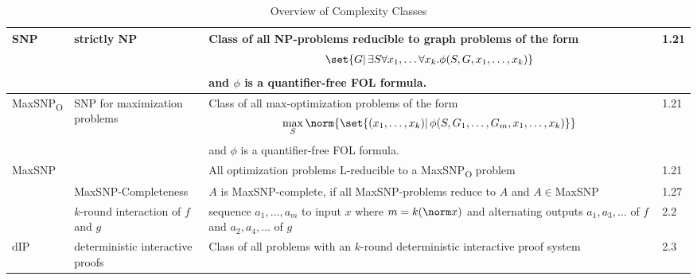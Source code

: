 \documentclass[a4paper, 9pt, landscape]{article}
\begin{document}
\begin{table}[ht!]
\begin{tabular}[ht!]{l | p{7cm}| p{14cm}| l}
    
    SNP & strictly NP & Class of all NP-problems reducible to graph problems of the form
                        \begin{align*}
                          \set{G |\, \exists S \forall x_1, \dots \forall x_k. \phi(S, G, x_1, \dots, x_k)}
                        \end{align*}
                        and $\phi$ is a quantifier-free FOL formula.  & 1.21 \\ \hline
    MaxSNP\textsubscript{O} &SNP for maximization problems & Class of all max-optimization problems of the form
                                                             \begin{align*}
                                                               \max_S\norm{\set{(x_1, \dots, x_k)|\, \phi(S, G_1, \dots, G_m, x_1, \dots, x_k)}}
                                                             \end{align*}
                                                             and $\phi$ is a quantifier-free FOL formula.  & 1.21 \\ \hline
    MaxSNP & & All optimization problems L-reducible to a MaxSNP\textsubscript{O} problem & 1.21 \\ \hline
    &MaxSNP-Completeness & $A$ is MaxSNP-complete, if all MaxSNP-problems reduce to $A$ and $A \in$MaxSNP   &1.27 \\ \hline

    &$k$-round interaction of $f$ and $g$& sequence $a_1, \dots, a_m$ to input $x$ where $m =k(\norm x)$ and alternating outputs $a_1, a_3, \dots$ of $f$ and $a_2, a_4, \dots$ of $g$  &2.2 \\ \hline
    dIP & deterministic interactive proofs & Class of all problems with an $k$-round deterministic interactive proof system & 2.3 \\ \hline
  \end{tabular}
  \caption{Overview of Complexity Classes}
  \label{tab:classes}
\end{table}
\end{document}
